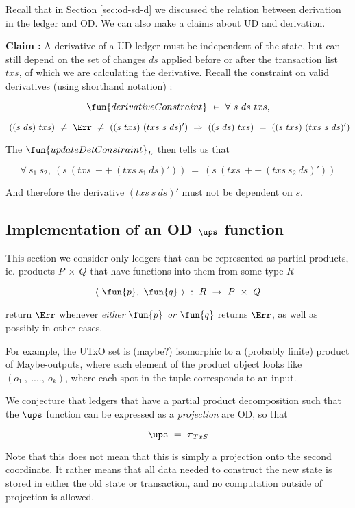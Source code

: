 Recall that in Section \ref{sec:od-sd-d} we discussed the relation between derivation
in the ledger and OD. We can also make a claims about UD and derivation.

\textbf{Claim : } A derivative of a UD ledger must be independent of the state,
but can still depend on the set of changes $ds$ applied before or after the
transaction list $txs$, of which we are calculating the derivative.
Recall the constraint on valid derivatives (using shorthand notation) :

\[ \fun{derivativeConstraint} ~\in~ \forall~s~ds~txs, \]

\[ ~((s~ds)~txs)~\neq~\Err~\neq~((s~txs) ~(txs ~s~ ds)')~\Rightarrow~((s~ds)~txs)~=~((s~txs) ~(txs ~s~ ds)') \]

The $\fun{updateDetConstraint}_L$ then tells us that

\[ \forall~s_1~s_2,~ (s~(txs~++~(txs~s_1~ds)'))~=~(s~(txs~++~(txs~s_2~ds)')) \]

And therefore the derivative $(txs~s~ds)'$ must not be dependent on $s$.



\subsection{Implementation of an OD $\ups$ function}


This section we consider only ledgers that can be represented as partial products, ie.
products $P~\times~Q$ that have functions into them from some type $R$

\[ \langle~\fun{p},~\fun{q}~\rangle~:~R~\to~P~\times~Q \]

return $\Err$ whenever \emph{either} $\fun{p}$ \emph{or} $\fun{q}$ returns $\Err$,
as well as possibly in other cases.

For example, the UTxO set is (maybe?) isomorphic to a (probably finite) product of Maybe-outputs,
where each element of the product object looks like $(o_1~,~ .... ,~ o_k)$, where each spot in the
tuple corresponds to an input.

We conjecture that ledgers that have a partial product decomposition such that
the $\ups$ function can be expressed as a \emph{projection} are OD, so that

\[ \ups ~=~\pi_{TxS} \]

Note that this does not mean that this is simply a projection onto the second
coordinate. It rather means that all data needed to construct the
new state is stored in either the old state or transaction, and no computation outside
of projection is allowed.

